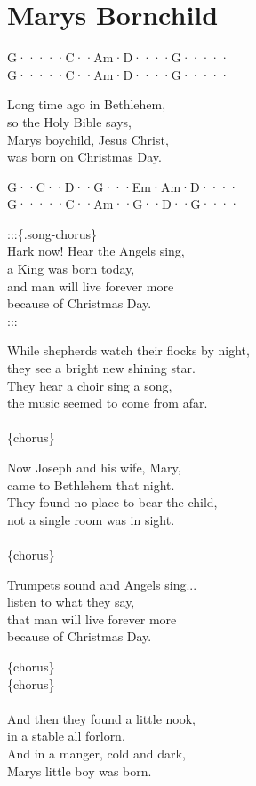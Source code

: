 \documentclass[
  letterpaper,
  twoside=false]{scrbook}
\begin{document}
\hypertarget{marys-bornchild}{%
\chapter{Marys Bornchild}\label{marys-bornchild}}

G·····\textbar C··Am·\textbar D····\textbar G·····\textbar{}\\
G·····\textbar C··Am·\textbar D····\textbar G·····\textbar{}

Long time ago in Bethlehem,\\
so the Holy Bible says, ~\\
Mary\textquotesingle s boychild, Jesus Christ,\\
was born on Christmas Day.

G··C··\textbar D··G···\textbar Em·Am·\textbar D····\textbar{}\\
G·····\textbar C··Am··\textbar G··D··\textbar G····\textbar{}

:::\{.song-chorus\}\\
Hark now! Hear the Angels sing,\\
a King was born today,\\
and man will live forever more\\
because of Christmas Day.\\
::: ~

While shepherds watch their flocks by night,\\
they see a bright new shining star.\\
They hear a choir sing a song, ~\\
the music seemed to come from afar. ~\\
\hspace*{0.333em}\\
\{chorus\}

Now Joseph and his wife, Mary,\\
came to Bethlehem that night.\\
They found no place to bear the child, ~\\
not a single room was in sight. ~ ~ ~\\
\hspace*{0.333em}\\
\{chorus\}

Trumpets sound and Angels sing...\\
listen to what they say,\\
that man will live forever more\\
because of Christmas Day.

\{chorus\}\\
\{chorus\}\\
\hspace*{0.333em}\\
And then they found a little nook,\\
in a stable all forlorn.\\
And in a manger, cold and dark,\\
Mary\textquotesingle s little boy was born.
\end{document}
